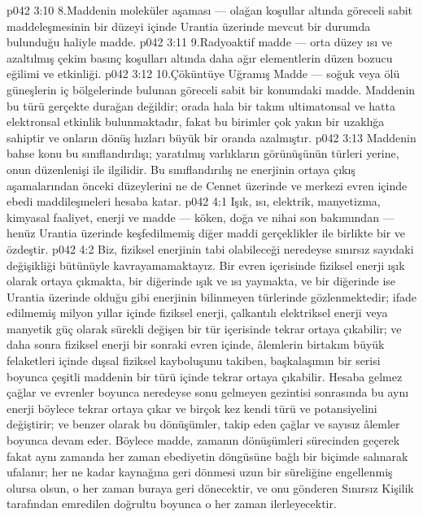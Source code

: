 \vs p042 3:10 8.\bibnobreakspace Maddenin moleküler aşaması --- olağan koşullar altında göreceli sabit maddeleşmesinin bir düzeyi içinde Urantia üzerinde mevcut bir durumda bulunduğu haliyle madde.
\vs p042 3:11 9.\bibnobreakspace Radyoaktif madde --- orta düzey ısı ve azaltılmış çekim basınç koşulları altında daha ağır elementlerin düzen bozucu eğilimi ve etkinliği.
\vs p042 3:12 10.\bibnobreakspace Çöküntüye Uğramış Madde --- soğuk veya ölü güneşlerin iç bölgelerinde bulunan göreceli sabit bir konumdaki madde. Maddenin bu türü gerçekte durağan değildir; orada hala bir takım ultimatonsal ve hatta elektronsal etkinlik bulunmaktadır, fakat bu birimler çok yakın bir uzaklığa sahiptir ve onların dönüş hızları büyük bir oranda azalmıştır.
\vs p042 3:13 Maddenin bahse konu bu sınıflandırılışı; yaratılmış varlıkların görünüşünün türleri yerine, onun düzenlenişi ile ilgilidir. Bu sınıflandırılış ne enerjinin ortaya çıkış aşamalarından önceki düzeylerini ne de Cennet üzerinde ve merkezi evren içinde ebedi maddileşmeleri hesaba katar.
\vs p042 4:1 Işık, ısı, elektrik, manyetizma, kimyasal faaliyet, enerji ve madde --- köken, doğa ve nihai son bakımından --- henüz Urantia üzerinde keşfedilmemiş diğer maddi gerçeklikler ile birlikte bir ve özdeştir.
\vs p042 4:2 Biz, fiziksel enerjinin tabi olabileceği neredeyse sınırsız sayıdaki değişikliği bütünüyle kavrayamamaktayız. Bir evren içerisinde fiziksel enerji ışık olarak ortaya çıkmakta, bir diğerinde ışık ve ısı yaymakta, ve bir diğerinde ise Urantia üzerinde olduğu gibi enerjinin bilinmeyen türlerinde gözlenmektedir; ifade edilmemiş milyon yıllar içinde fiziksel enerji, çalkantılı elektriksel enerji veya manyetik güç olarak sürekli değişen bir tür içerisinde tekrar ortaya çıkabilir; ve daha sonra fiziksel enerji bir sonraki evren içinde, âlemlerin birtakım büyük felaketleri içinde dışsal fiziksel kayboluşunu takiben, başkalaşımın bir serisi boyunca çeşitli maddenin bir türü içinde tekrar ortaya çıkabilir. Hesaba gelmez çağlar ve evrenler boyunca neredeyse sonu gelmeyen gezintisi sonrasında bu aynı enerji böylece tekrar ortaya çıkar ve birçok kez kendi türü ve potansiyelini değiştirir; ve benzer olarak bu dönüşümler, takip eden çağlar ve sayısız âlemler boyunca devam eder. Böylece madde, zamanın dönüşümleri sürecinden geçerek fakat aynı zamanda her zaman ebediyetin döngüsüne bağlı bir biçimde salınarak ufalanır; her ne kadar kaynağına geri dönmesi uzun bir süreliğine engellenmiş olursa olsun, o her zaman buraya geri dönecektir, ve onu gönderen Sınırsız Kişilik tarafından emredilen doğrultu boyunca o her zaman ilerleyecektir.
